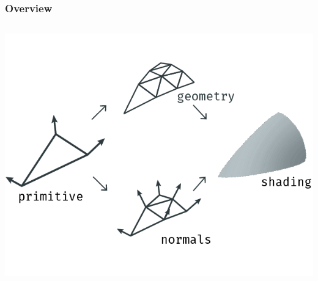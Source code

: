 	\begin{frame}\frametitle{Overview}
		\begin{columns}
			\begin{column}{0.9\textwidth}
				\begin{center}
					\includegraphics[width=\textwidth]{./img/1_single/recap_quadraticVsCubicPatch.png}
				\end{center}		
			\end{column}
		\end{columns}
	\end{frame}	
